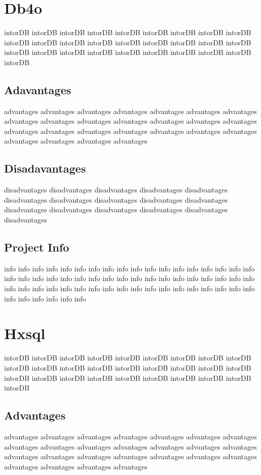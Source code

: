 		\section{Db4o}
		intorDB intorDB intorDB intorDB intorDB intorDB intorDB 
		intorDB intorDB intorDB intorDB intorDB intorDB intorDB 
		intorDB intorDB intorDB intorDB intorDB intorDB intorDB 
		intorDB intorDB intorDB intorDB intorDB intorDB intorDB 
		
			\subsection{Adavantages}
			advantages advantages advantages advantages advantages 
			advantages advantages advantages advantages advantages 
			advantages advantages advantages advantages advantages 
			advantages advantages advantages advantages advantages 
			advantages advantages advantages advantages advantages 
			
			\subsection{Disadavantages}
			disadvantages disadvantages disadvantages disadvantages 
			disadvantages disadvantages disadvantages disadvantages 
			disadvantages disadvantages disadvantages disadvantages 
			disadvantages disadvantages disadvantages disadvantages 
			
			\subsection{Project Info}
			info info info info info info info info info info info info 
			info info info info info info info info info info info info 
			info info info info info info info info info info info info 
			info info info info info info info info info info info info 
			info info info info info info info info info info info info
				
		\section{Hxsql}
		intorDB intorDB intorDB intorDB intorDB intorDB intorDB 
		intorDB intorDB intorDB intorDB intorDB intorDB intorDB 
		intorDB intorDB intorDB intorDB intorDB intorDB intorDB 
		intorDB intorDB intorDB intorDB intorDB intorDB intorDB 
		
			\subsection{Advantages}
			advantages advantages advantages advantages advantages 
			advantages advantages advantages advantages advantages 
			advantages advantages advantages advantages advantages 
			advantages advantages advantages advantages advantages 
			advantages advantages advantages advantages advantages 
			
